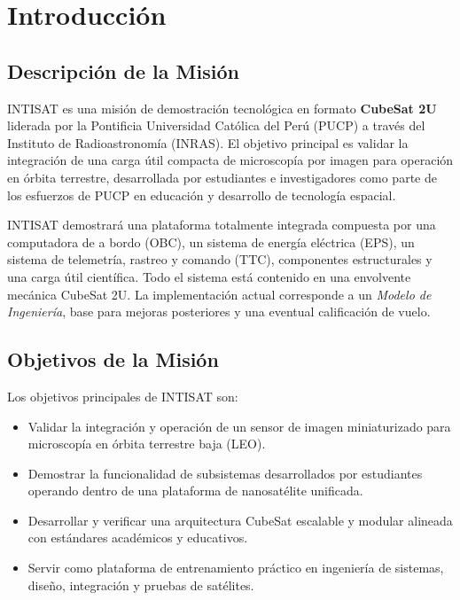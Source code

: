 \chapter{Introducción}
\pagestyle{fancy}

\section{Descripción de la Misión}
INTISAT es una misión de demostración tecnológica en formato \textbf{CubeSat 2U} liderada por la Pontificia Universidad Católica del Perú (PUCP) a través del Instituto de Radioastronomía (INRAS). El objetivo principal es validar la integración de una carga útil compacta de microscopía por imagen para operación en órbita terrestre, desarrollada por estudiantes e investigadores como parte de los esfuerzos de PUCP en educación y desarrollo de tecnología espacial.

INTISAT demostrará una plataforma totalmente integrada compuesta por una computadora de a bordo (OBC), un sistema de energía eléctrica (EPS), un sistema de telemetría, rastreo y comando (TTC), componentes estructurales y una carga útil científica. Todo el sistema está contenido en una envolvente mecánica CubeSat 2U. La implementación actual corresponde a un \textit{Modelo de Ingeniería}, base para mejoras posteriores y una eventual calificación de vuelo.


\section{Objetivos de la Misión}
Los objetivos principales de INTISAT son:
\begin{itemize}
    \item Validar la integración y operación de un sensor de imagen miniaturizado para microscopía en órbita terrestre baja (LEO).
    \item Demostrar la funcionalidad de subsistemas desarrollados por estudiantes operando dentro de una plataforma de nanosatélite unificada.
    \item Desarrollar y verificar una arquitectura CubeSat escalable y modular alineada con estándares académicos y educativos.
    \item Servir como plataforma de entrenamiento práctico en ingeniería de sistemas, diseño, integración y pruebas de satélites.
\end{itemize}

